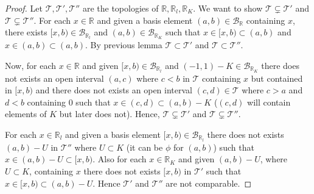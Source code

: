 \documentclass[12pt,reqno]{amsart}
\theoremstyle{plain}
\theoremstyle{definition}
\newcommand{\bb}[1]{\mathbb{#1}}
\newcommand{\cal}[1]{\mathcal{#1}}
\begin{document}
\begin{proof}
    Let $\mathcal{T}, \cal T', \cal T''$ are the topologies of $\bb R, \bb R_l, \bb R_K$. We want to show $\cal T \subsetneq \cal T'$ and $\cal T \subsetneq \cal T''$. For each $x \in \bb R$ and given a basis element $(a,b) \in \cal B_{\bb R}$ containing $x$, there exists $[x,b) \in \cal B_{\bb R_l}$ and $(a,b) \in \cal B_{\bb R_K}$ such that $x \in [x,b) \subset (a,b)$ and $x \in (a,b) \subset (a,b)$. By previous lemma $\cal T \subset \cal T'$ and $\cal T \subset \cal T''$.
    \par Now, for each $x \in \bb R$ and given $[x,b) \in \cal B_{\bb R_l}$ and $(-1,1) - K \in \cal B_{\bb R_K}$ there does not exists an open interval $(a,c)$ where $c < b$ in $\cal T$ containing $x$ but contained in $[x,b)$ and there does not exists an open interval $(c,d) \in \cal T$ where $c > a$ and $d < b$ containing $0$ such that $x \in (c,d) \subset (a,b) - K$ ($(c,d)$ will contain elements of $K$ but later does not). Hence, $\cal T \subsetneq \cal T'$ and $\cal T \subsetneq \cal T''$. 
    \par For each $x \in \bb R_l$ and given a basis element $[x, b) \in \cal B_{\bb R_l}$ there does not exists $(a,b) - U$ in $\cal T'' $ where $U \subset K$ (it can be $\phi$ for $(a,b)$) such that $x \in (a,b) - U \subset [x,b)$. Also for each $x \in \bb R_K$ and given $(a,b) - U$, where $U \subset K$, containing $x$ there does not exists $[x,b)$ in $\cal T'$ such that $x \in [x,b) \subset (a,b)- U$. Hence $\cal T'$ and $\cal T''$ are not comparable.
\end{proof}
\end{document}
